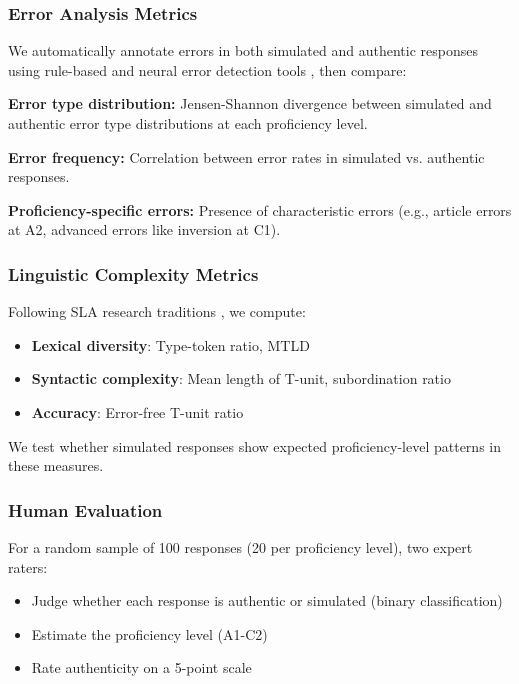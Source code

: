 \subsubsection{Error Analysis Metrics}

We automatically annotate errors in both simulated and authentic responses using rule-based and neural error detection tools \cite{bryant2023grammatical}, then compare:

\textbf{Error type distribution:} Jensen-Shannon divergence between simulated and authentic error type distributions at each proficiency level.

\textbf{Error frequency:} Correlation between error rates in simulated vs. authentic responses.

\textbf{Proficiency-specific errors:} Presence of characteristic errors (e.g., article errors at A2, advanced errors like inversion at C1).

\subsubsection{Linguistic Complexity Metrics}

Following SLA research traditions \cite{housen2012complexity}, we compute:

\begin{itemize}
    \item \textbf{Lexical diversity}: Type-token ratio, MTLD
    \item \textbf{Syntactic complexity}: Mean length of T-unit, subordination ratio
    \item \textbf{Accuracy}: Error-free T-unit ratio
\end{itemize}

We test whether simulated responses show expected proficiency-level patterns in these measures.

\subsubsection{Human Evaluation}

For a random sample of 100 responses (20 per proficiency level), two expert raters:
\begin{itemize}
    \item Judge whether each response is authentic or simulated (binary classification)
    \item Estimate the proficiency level (A1-C2)
    \item Rate authenticity on a 5-point scale
\end{itemize}

